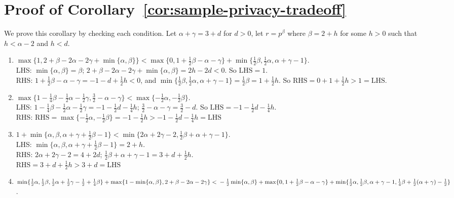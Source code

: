 \documentclass[11pt]{article}
\begin{document}
\section{Proof of Corollary~\ref{cor:sample-privacy-tradeoff}}\label{proof:cor:sample-privacy-tradeoff}
    We prove this corollary by checking each condition. Let $\alpha+\gamma=3+d$ for $d>0$, let $r=p^{\beta}$ where $\beta=2+h$ for some $h>0$ such that $h<\alpha-2$ and $h<d$.
    \begin{enumerate}
        \item $\max\{1,2+\beta-2\alpha-2\gamma+\min\{\alpha,\beta\}\}<\max\{0,1+\frac{1}{2}\beta-\alpha-\gamma\}+\min\{\frac{1}{2}\beta,\frac{1}{2}\alpha,\alpha+\gamma-1\}$.\\
        LHS: $\min\{\alpha,\beta\}=\beta$; $2+\beta-2\alpha-2\gamma+\min\{\alpha,\beta\}=2h-2d<0$. So $\mbox{LHS}=1$.\\
        RHS: $1+\frac{1}{2}\beta-\alpha-\gamma=-1-d+\frac{1}{2}h<0$, and $\min\{\frac{1}{2}\beta,\frac{1}{2}\alpha,\alpha+\gamma-1\}=\frac{1}{2}\beta=1+\frac{1}{2}h$. So $\mbox{RHS}=0+1+\frac{1}{2}h>1=\mbox{LHS}$.
        \item $\max\{1-\frac{1}{4}\beta-\frac{1}{2}\alpha-\frac{1}{2}\gamma,\frac{3}{2}-\alpha-\gamma\}<\max\{-\frac{1}{2}\alpha,-\frac{1}{2}\beta\}$.\\
        LHS: $1-\frac{1}{4}\beta-\frac{1}{2}\alpha-\frac{1}{2}\gamma=-1-\frac{1}{2}d-\frac{1}{4}h$; $\frac{3}{2}-\alpha-\gamma=\frac{3}{2}-d$. So $\mbox{LHS}=-1-\frac{1}{2}d-\frac{1}{4}h$.\\
        RHS: $\mbox{RHS}=\max\{-\frac{1}{2}\alpha,-\frac{1}{2}\beta\}=-1-\frac{1}{2}h>-1-\frac{1}{2}d-\frac{1}{4}h=\mbox{LHS}$
        \item $1+\min\{\alpha,\beta,\alpha+\gamma+\frac{1}{2}\beta-1\}<\min\{2\alpha+2\gamma-2,\frac{1}{2}\beta+\alpha+\gamma-1\}$.\\
        LHS: $\min\{\alpha,\beta,\alpha+\gamma+\frac{1}{2}\beta-1\}=2+h$.\\
        RHS: $2\alpha+2\gamma-2=4+2d$; $\frac{1}{2}\beta+\alpha+\gamma-1=3+d+\frac{1}{2}h$.\\
        $\mbox{RHS}=3+d+\frac{1}{2}h>3+d=\mbox{LHS}$
        \item $\min\{\frac{1}{2}\alpha,\frac{1}{2}\beta,\frac{1}{2}\alpha+\frac{1}{2}\gamma-\frac{1}{2}+\frac{1}{4}\beta\}+\max\{1-\min\{\alpha,\beta\},2+\beta-2\alpha-2\gamma\}<\\
        -\frac{1}{2}\min\{\alpha,\beta\}+\max\{0,1+\frac{1}{2}\beta-\alpha-\gamma\}+\min\{\frac{1}{2}\alpha,\frac{1}{2}\beta,\alpha+\gamma-1,\frac{1}{4}\beta+\frac{1}{2}(\alpha+\gamma)-\frac{1}{2}\}$.\\

\end{enumerate}
\end{document}
